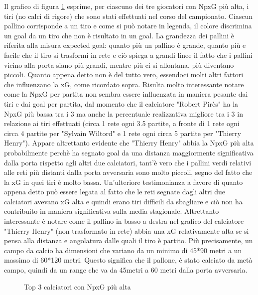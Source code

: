             \vspace{10pt}

            Il grafico di figura \ref{fig:RPlot07} esprime, per ciascuno dei tre giocatori con NpxG più alta, i tiri (no calci di rigore) che sono stati effettuati nel corso del campionato. Ciascun pallino corrisponde a un tiro e come si può notare in legenda, il colore discrimina un goal da un tiro che non è risultato in un goal. La grandezza dei pallini è riferita alla misura expected goal: quanto più un pallino è grande, quanto più e facile che il tiro si trasformi in rete e ciò spiega a grandi linee il fatto che i pallini vicino alla porta siano più grandi, mentre più ci si allontana, più diventano piccoli. Quanto appena detto non è del tutto vero, essendoci molti altri fattori che influenzano la xG, come ricordato sopra. Risulta molto interessante notare come la NpxG per partita non sembra essere influenzata in maniera pesante dai tiri e dai goal per partita, dal momento che il calciatore "Robert Pirès" ha la NpxG più bassa tra i 3 ma anche la percentuale realizzativa migliore tra i 3 in relazione ai tiri effettuati (circa 1 rete ogni 3.5 partite, a fronte di 1 rete ogni circa 4 partite per "Sylvain Wiltord" e 1 rete ogni circa 5 partite per "Thierry Henry"). Appare altrettanto evidente che "Thierry Henry" abbia la NpxG più alta probabilmente perchè ha segnato goal da una distanza maggiormente significativa dalla porta rispetto agli altri due calciatori, tant'è vero che i pallini verdi relativi alle reti più distanti dalla porta avversaria sono molto piccoli, segno del fatto che la xG in quei tiri è molto bassa. Un'ulteriore testimonianza a favore di quanto appena detto può essere legata al fatto che le reti segnate dagli altri due calciatori avevano xG alta e quindi erano tiri difficili da sbagliare e ciò non ha contribuito in maniera significativa sulla media stagionale. Altrettanto interessante è notare come il pallino in basso a destra nel grafico del calciatore "Thierry Henry" (non trasformato in rete) abbia una xG relativamente alta se si pensa alla distanza e angolatura dalle quali il tiro è partito. Più precisamente, un campo da calcio ha dimensioni che variano da un minimo di 45*90 metri a un massimo di 60*120 metri. Questo significa che il pallone, è stato calciato da metà campo, quindi da un range che va da 45metri a 60 metri dalla porta avversaria. 

            \vspace{10pt}
            
            \begin{figure}[h]
                \centering
                \caption{Top 3 calciatori con NpxG più alta}
                \label{fig:RPlot07}
            \end{figure}

